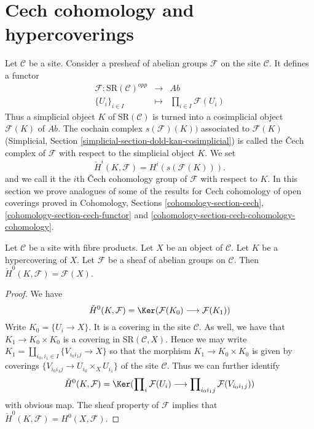 \section{Cech cohomology and hypercoverings}
\label{section-hyper-cech}

\noindent
Let $\mathcal{C}$ be a site. Consider a presheaf of
abelian groups $\mathcal{F}$ on the site $\mathcal{C}$.
It defines a functor
\begin{eqnarray*}
\mathcal{F} : \text{SR}(\mathcal{C})^{opp}
& \longrightarrow &
\textit{Ab} \\
\{U_i\}_{i \in I} &
\longmapsto &
\prod\nolimits_{i \in I} \mathcal{F}(U_i)
\end{eqnarray*}
Thus a simplicial object $K$ of $\text{SR}(\mathcal{C})$
is turned into a cosimplicial object $\mathcal{F}(K)$ of $\textit{Ab}$.
The cochain complex $s(\mathcal{F})(K))$ associated to $\mathcal{F}(K)$
(Simplicial, Section
\ref{simplicial-section-dold-kan-cosimplicial})
is called the {\v C}ech complex of $\mathcal{F}$ with
respect to the simplicial object $K$. We set
$$
\check{H}^i(K, \mathcal{F})
=
H^i(s(\mathcal{F}(K))).
$$
and we call it the $i$th {\v C}ech cohomology group
of $\mathcal{F}$ with respect to $K$.
In this section we prove analogues of some of the results for
Cech cohomology of open coverings proved in
Cohomology, Sections \ref{cohomology-section-cech},
\ref{cohomology-section-cech-functor} and
\ref{cohomology-section-cech-cohomology-cohomology}.

\begin{lemma}
\label{lemma-h0-cech}
Let $\mathcal{C}$ be a site with fibre products.
Let $X$ be an object of $\mathcal{C}$.
Let $K$ be a hypercovering of $X$.
Let $\mathcal{F}$ be a sheaf of abelian groups on $\mathcal{C}$.
Then $\check{H}^0(K, \mathcal{F}) = \mathcal{F}(X)$.
\end{lemma}

\begin{proof}
We have
$$
\check{H}^0(K, \mathcal{F})
=
\Ker(\mathcal{F}(K_0) \longrightarrow \mathcal{F}(K_1))
$$
Write $K_0 = \{U_i \to X\}$. It is a covering in the site
$\mathcal{C}$. As well, we have that $K_1 \to K_0 \times K_0$
is a covering in $\text{SR}(\mathcal{C}, X)$. Hence we may
write $K_1 = \amalg_{i_0, i_1 \in I} \{V_{i_0i_1j} \to X\}$
so that the morphism $K_1 \to K_0 \times K_0$ is given
by coverings $\{V_{i_0i_1j} \to U_{i_0} \times_X U_{i_1}\}$
of the site $\mathcal{C}$. Thus we can further identify
$$
\check{H}^0(K, \mathcal{F})
=
\Ker(
\prod\nolimits_i \mathcal{F}(U_i)
\longrightarrow
\prod\nolimits_{i_0i_1 j} \mathcal{F}(V_{i_0i_1j})
)
$$
with obvious map. The sheaf property of $\mathcal{F}$
implies that $\check{H}^0(K, \mathcal{F}) = H^0(X, \mathcal{F})$.
\end{proof}

